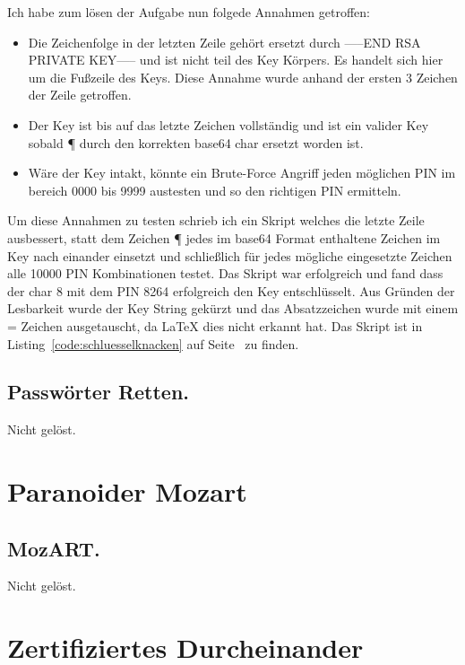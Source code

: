 \documentclass[12pt, a4paper, titlepage, oneside]{scrartcl}
\begin{document}
	Ich habe zum lösen der Aufgabe nun folgede Annahmen getroffen:

	\begin{itemize}
		\item Die Zeichenfolge in der letzten Zeile gehört ersetzt durch -----END RSA PRIVATE KEY----- und ist nicht teil des Key Körpers. Es handelt sich hier um die Fußzeile des Keys. Diese Annahme wurde anhand der ersten 3 Zeichen der Zeile getroffen.
		\item Der Key ist bis auf das letzte Zeichen vollständig und ist ein valider Key sobald ¶ durch den korrekten base64 char ersetzt worden ist. 
		\item Wäre der Key intakt, könnte ein Brute-Force Angriff jeden möglichen PIN im bereich 0000 bis 9999 austesten und so den richtigen PIN ermitteln.
	\end{itemize}

	Um diese Annahmen zu testen schrieb ich ein Skript welches die letzte Zeile ausbessert, statt dem Zeichen ¶ jedes im base64 Format enthaltene Zeichen im Key nach einander einsetzt und schließlich für jedes mögliche eingesetzte Zeichen alle 10000 PIN Kombinationen testet. Das Skript war erfolgreich und fand dass der char 8 mit dem PIN 8264 erfolgreich den Key entschlüsselt. Aus Gründen der Lesbarkeit wurde der Key String gekürzt und das Absatzzeichen wurde mit einem = Zeichen ausgetauscht, da LaTeX dies nicht erkannt hat. Das Skript ist in Listing~\ref*{code:schluesselknacken} auf Seite~\pageref*{code:schluesselknacken} zu finden.



	\subsection{Passw\"orter Retten.}
	Nicht gelöst.

	\section{Paranoider Mozart}

	\subsection{MozART.}
	Nicht gelöst.

	\newpage

	\section{Zertifiziertes Durcheinander}
\end{document}
